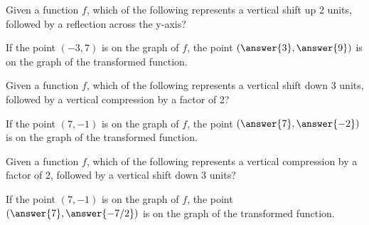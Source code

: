 \documentclass{ximera}
\author{David Kish, Kenneth Berglund}
\begin{document}
\begin{exercise}
Given a function $f$, which of the following represents a vertical shift up 2 units, followed by a reflection across the y-axis?

\begin{multipleChoice}  
\end{multipleChoice}  

\begin{exercise}
If the point $(-3, 7)$ is on the graph of $f$, the point $(\answer{3}, \answer{9})$ is on the graph of the transformed function.
\end{exercise}
\end{exercise}


\begin{exercise}
Given a function $f$, which of the following represents a vertical shift down 3 units, followed by a vertical compression by a factor of 2?

\begin{multipleChoice}  
\end{multipleChoice}  

\begin{exercise}
If the point $(7, -1)$ is on the graph of $f$, the point $(\answer{7}, \answer{-2})$ is on the graph of the transformed function.
\end{exercise}
\end{exercise}


\begin{exercise}
Given a function $f$, which of the following represents a vertical compression by a factor of 2, followed by a vertical shift down 3 units?

\begin{multipleChoice}  
\end{multipleChoice}  

\begin{exercise}
If the point $(7, -1)$ is on the graph of $f$, the point $(\answer{7}, \answer{-7/2})$ is on the graph of the transformed function.
\end{exercise}
\end{exercise}
\end{document}
